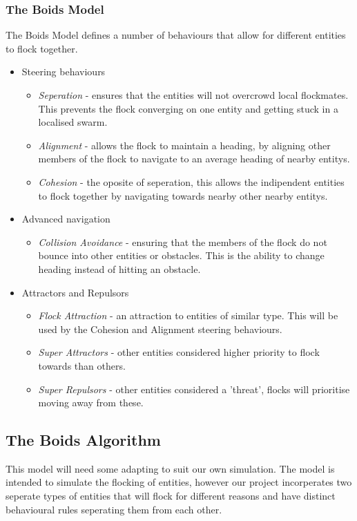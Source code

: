 \subsubsection{The Boids Model}
The Boids Model defines a number of behaviours that allow for different entities to flock together.
\begin{itemize}
	\item Steering behaviours
	\begin{itemize}
		\item \emph{Seperation} - ensures that the entities will not overcrowd local flockmates. This prevents the flock converging on one entity and getting stuck in a localised swarm.
		\item \emph{Alignment} - allows the flock to maintain a heading, by aligning other members of the flock to navigate to an average heading of nearby entitys.
		\item \emph{Cohesion} - the oposite of seperation, this allows the indipendent entities to flock together by navigating towards nearby other nearby entitys.
	\end{itemize}
	\item Advanced navigation
	\begin{itemize}
		\item \emph{Collision Avoidance} - ensuring that the members of the flock do not bounce into other entities or obstacles. This is the ability to change heading instead of hitting an obstacle.
	\end{itemize}
	\item Attractors and Repulsors
	\begin{itemize}
		\item \emph{Flock Attraction} - an attraction to entities of similar type. This will be used by the Cohesion and Alignment steering behaviours.
		\item \emph{Super Attractors} - other entities considered higher priority to flock towards than others.
		\item \emph{Super Repulsors} - other entities considered a 'threat', flocks will prioritise moving away from these.
	\end{itemize}
\end{itemize}

\subsection{The Boids Algorithm}
This model will need some adapting to suit our own simulation. The model is intended to simulate the flocking of entities, however our project incorperates two seperate types of entities that will flock for different reasons and have distinct behavioural rules seperating them from each other.

